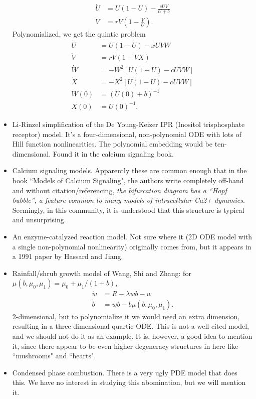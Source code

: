 \documentclass[10pt]{article}
\begin{document}
\begin{itemize}
\begin{align*}
\dot U&=U(1-U)-\frac{cUV}{U+b}\\
\dot V&=rV\left(1-\frac{V}{U}\right).
\end{align*}
Polynomialized, we get the quintic problem
\begin{align*}
\dot U&=U(1-U)-xUVW\\
\dot V&=rV\left(1-VX\right)\\
\dot W&=-W^2[U(1-U)-cUVW]\\
\dot X&=-X^2[U(1-U)-cUVW]\\
W(0)&=(U(0)+b)^{-1}\\
X(0)&=U(0)^{-1}.
\end{align*}
\item Li-Rinzel simplification of the De Young-Keizer IPR (Inositol trisphosphate receptor) model. It's a four-dimensional, non-polynomial ODE with lots of Hill function nonlinearities. The polynomial embedding would be ten-dimensional. Found it in the calcium signaling book.
\item Calcium signaling models. Apparently these are common enough that in the book ``Models of Calcium Signaling", the authors write completely off-hand and without citation/referencing, \emph{the bifurcation diagram has a ``Hopf bubble”, a feature common to many models of intracellular Ca2+ dynamics}. Seemingly, in this community, it is understood that this structure is typical and unsurprising.
\item An enzyme-catalyzed reaction model. Not sure where it (2D ODE model with a single non-polynomial nonlinearity) originally comes from, but it appears in a 1991 paper by Hassard and Jiang. 
\item Rainfall/shrub growth model of Wang, Shi and Zhang: for $\mu(b,\mu_0,\mu_1)=\mu_0 + \mu_1/(1+b)$,
\begin{align*}
\dot w&=R-\lambda wb - w\\
\dot b&=wb - b\mu(b,\mu_0,\mu_1).
\end{align*}
2-dimensional, but to polynomialize it we would need an extra dimension, resulting in a three-dimensional quartic ODE. This is not a well-cited model, and we should not do it as an example. It is, however, a good idea to mention it, since there appear to be even higher degeneracy structures in here like ``mushrooms" and ``hearts".
\item Condensed phase combustion. There is a very ugly PDE model that does this. We have no interest in studying this abomination, but we will mention it.
\end{itemize}
\end{document}
